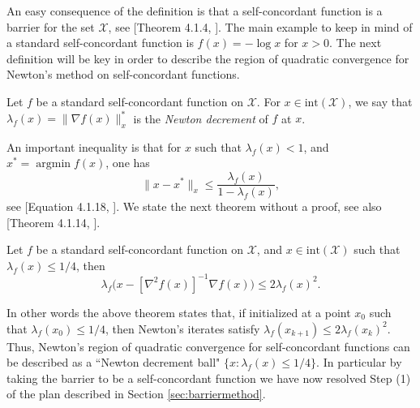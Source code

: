 \documentclass[openany]{now}
\newcommand{\argmin}{\mathop{\mathrm{argmin}}}
\begin{document}
An easy consequence of the definition is that a self-concordant function is a barrier for the set $\mathcal{X}$, see [Theorem 4.1.4, \cite{Nes04}]. The main example to keep in mind of a standard self-concordant function is $f(x) = - \log x$ for $x > 0$. The next definition will be key in order to describe the region of quadratic convergence for Newton's method on self-concordant functions. 

\begin{definition}
Let $f$ be a standard self-concordant function on $\mathcal{X}$. For $x \in \mathrm{int}(\mathcal{X})$, we say that $\lambda_f(x) = \|\nabla f(x)\|_x^*$ is the {\em Newton decrement} of $f$ at $x$.
\end{definition}
An important inequality is that for $x$ such that $\lambda_f(x) < 1$, and $x^* = \argmin f(x)$, one has
\begin{equation} \label{eq:trucipm3}
\|x - x^*\|_x \leq \frac{\lambda_f(x)}{1 - \lambda_f(x)} ,
\end{equation}
see [Equation 4.1.18, \cite{Nes04}]. We state the next theorem without a proof, see also [Theorem 4.1.14, \cite{Nes04}].
\begin{theorem} \label{th:NMsc}
Let $f$ be a standard self-concordant function on $\mathcal{X}$, and $x \in \mathrm{int}(\mathcal{X})$ such that $\lambda_f(x) \leq 1/4$, then
$$\lambda_f\Big(x - [\nabla^2 f(x)]^{-1} \nabla f(x)\Big) \leq 2 \lambda_f(x)^2 .$$
\end{theorem}
In other words the above theorem states that, if initialized at a point $x_0$ such that $\lambda_f(x_0) \leq 1/4$, then Newton's iterates satisfy $\lambda_f(x_{k+1}) \leq 2 \lambda_f(x_k)^2$. Thus, Newton's region of quadratic convergence for self-concordant functions can be described as a ``Newton decrement ball" $\{x : \lambda_f(x) \leq 1/4\}$. In particular by taking the barrier to be a self-concordant function we have now resolved Step (1) of the plan described in Section \ref{sec:barriermethod}. 
\end{document}
